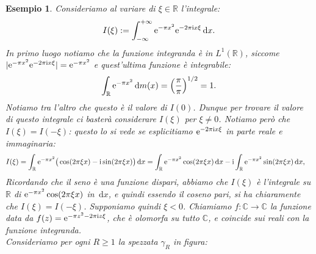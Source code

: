 \documentclass[11pt]{book}
\theoremstyle{Definizione}
\theoremstyle{TeoremaProposizioneLemmaCorollarioCongettura}
\theoremstyle{OsservazioneNotaEsempio}
\newtheorem{myes}{Esempio}[section]
\newcommand{\R}{\mathbb{R}}
\newcommand{\C}{\mathbb{C}}
\renewcommand{\i}{\textup{i}}
\newcommand{\e}{\textup{e}}
\renewcommand{\d}{\mathrm{d}}
\newcommand{\dx}{\,\d x}
\begin{document}
\begin{myes}\label{es:EsempioTrasformataDiFourierExp(-pi x^2)}
Consideriamo al variare di $\xi\in \R$ l'integrale:
$$
I(\xi) := \int_{-\infty}^{+\infty} \e^{-\pi x^2} \e^{-2\pi\i x \xi} \dx.
$$
In primo luogo notiamo che la funzione integranda è in $L^1(\R)$, siccome $|\e^{-\pi x^2} \e^{-2\pi \i x \xi}| = \e^{-\pi x^2}$ e quest'ultima funzione è integrabile:
$$
\int_\R \e^{-\pi x^2} \, \d m(x) = \left(\frac{\pi}{\pi}\right)^{1/2} = 1.
$$
Notiamo tra l'altro che questo è il valore di $I(0)$. Dunque per trovare il valore di questo integrale ci basterà considerare $I(\xi)$ per $\xi\neq 0$. Notiamo però che $I(\xi) = I(-\xi)$: questo lo si vede se esplicitiamo $\e^{-2\pi\i x\xi}$ in parte reale e immaginaria:
\begin{align*}
I(\xi) &= \int_{\R} \e^{-\pi x^2} \big(\cos(2\pi\xi x) - \i \sin(2\pi\xi x)\big)\dx = \int_\R \e^{-\pi x^2} \cos(2\pi\xi x) \dx - \i\int_\R \e^{-\pi x^2} \sin(2\pi\xi x)\dx,
\end{align*}
Ricordando che il seno è una funzione dispari, abbiamo che $I(\xi)$ è l'integrale su $\R$ di $\e^{-\pi x^2}\cos(2\pi\xi x)$ in $\dx$, e quindi essendo il coseno pari, si ha chiaramente che $I(\xi) = I(-\xi)$.
Supponiamo quindi $\xi < 0$. Chiamiamo $f:\C \longrightarrow \C$ la funzione data da $f(z) = \e^{-\pi z^2-2\pi\i z\xi}$, che è olomorfa su tutto $\C$, e coincide sui reali con la funzione integranda.\\
Consideriamo per ogni $R \geq 1$ la spezzata $\gamma_R$ in figura:
\begin{center}

\end{center}
\end{myes}
\end{document}
